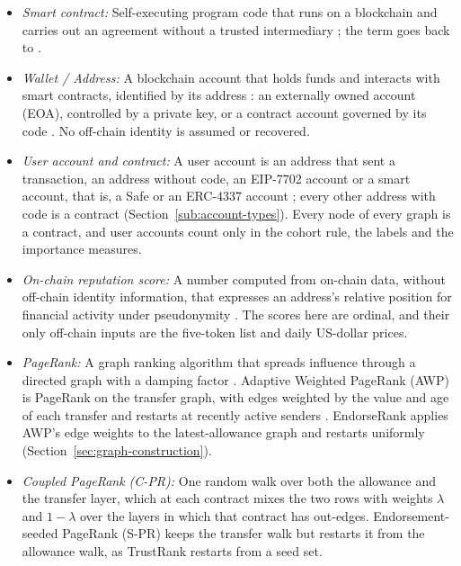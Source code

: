 \begin{itemize}
\item \emph{Smart contract:} Self-executing program code that runs on a blockchain and carries out an agreement without a trusted intermediary \parencite{buterin2014ethereum}; the term goes back to \textcite{szabo1997formalizing}.
\item \emph{Wallet / Address:} A blockchain account that holds funds and interacts with smart contracts, identified by its address \parencite{buterin2014ethereum}: an externally owned account (EOA), controlled by a private key, or a contract account governed by its code \parencite{antonopoulos2018mastering}. No off-chain identity is assumed or recovered.
\item \emph{User account and contract:} A user account is an address that sent a transaction, an address without code, an EIP-7702 account \parencite{buterin2024eip7702} or a smart account, that is, a Safe \parencite{safenddocs} or an ERC-4337 account \parencite{buterin2021erc4337}; every other address with code is a contract (Section~\ref{sub:account-types}). Every node of every graph is a contract, and user accounts count only in the cohort rule, the labels and the importance measures.
\item \emph{On-chain reputation score:} A number computed from on-chain data, without off-chain identity information, that expresses an address's relative position for financial activity under pseudonymity \parencite{do2023hodgerank}. The scores here are ordinal, and their only off-chain inputs are the five-token list and daily US-dollar prices.
\item \emph{PageRank:} A graph ranking algorithm that spreads influence through a directed graph with a damping factor \parencite{page1999pagerank}. Adaptive Weighted PageRank (AWP) is PageRank on the transfer graph, with edges weighted by the value and age of each transfer and restarts at recently active senders \parencite{do2023awp}. EndorseRank applies AWP's edge weights to the latest-allowance graph and restarts uniformly (Section~\ref{sec:graph-construction}).
\item \emph{Coupled PageRank (\mbox{C-PR}):} One random walk over both the allowance and the transfer layer, which at each contract mixes the two rows with weights $\lambda$ and $1-\lambda$ over the layers in which that contract has out-edges. Endorsement-seeded PageRank (\mbox{S-PR}) keeps the transfer walk but restarts it from the allowance walk, as TrustRank \parencite{gyongyi2004trustrank} restarts from a seed set.

\end{itemize}
